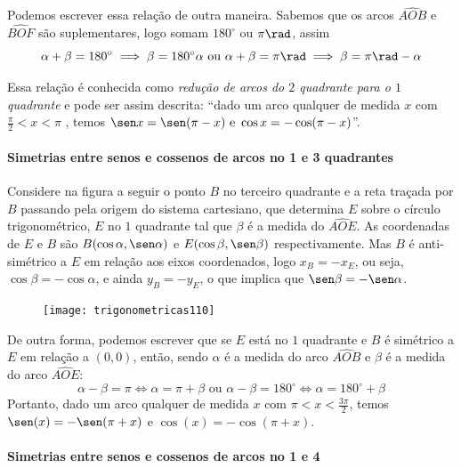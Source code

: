 Podemos escrever essa relação de outra maneira. Sabemos que os arcos $\widehat{AOB}$ e $\widehat{BOF}$ são suplementares, logo somam $180^{\circ}$ ou $\pi\rad$, assim
\begin{equation*}
\alpha+\beta=180^{\circ} \implies \beta = 180^{\circ}  \alpha\text{ ou }\alpha + \beta = \pi\rad \implies \beta = \pi\rad - \alpha
\end{equation*}

Essa relação é conhecida como \textit{redução de arcos do $2$ quadrante para o $1$ quadrante} e pode ser assim descrita: “dado um arco qualquer de medida $x$ com $\frac{\pi}{2} < x <\pi$ , temos $\sen x = \sen (\pi - x)\text{ e }\cos x = - \cos (\pi - x)$”.

\paragraph{Simetrias entre senos e cossenos de arcos no 1 e 3 quadrantes}

Considere na figura a seguir o ponto $B$ no terceiro quadrante e a reta traçada por $B$ passando pela origem do sistema cartesiano, que determina $E$ sobre o círculo trigonométrico, $E$ no $1$ quadrante tal que $\beta$ é a medida do $\widehat{AOE}$. As coordenadas de $E$ e $B$ são $B(\cos\alpha, \sen\alpha)$ e $E(\cos\beta, \sen\beta)$ respectivamente. Mas $B$ é anti-simétrico a $E$ em relação aos eixos coordenados, logo $x_B = - x_E$, ou seja, $\cos\beta = - \cos\alpha$, e ainda $y_B= - y_E$, o que implica que $\sen\beta = - \sen\alpha$.

\begin{figure}[H]
\centering

\texttt{[image: trigonometricas110]}
\end{figure}

De outra forma, podemos escrever que se $E$ está no $1$ quadrante e $B$ é simétrico a $E$ em relação a $(0,0)$, então, sendo $\alpha$ é a medida do arco $\widehat{AOB}$ e $\beta$ é a medida do arco $\widehat{AOE}$:
\begin{equation*}
\alpha-\beta=\pi\iff\alpha=\pi+\beta\text{ ou }\alpha-\beta=180^{\circ}\iff\alpha=180^{\circ}+\beta
\end{equation*}
Portanto, dado um arco qualquer de medida $x$ com $\pi<x<\frac{3\pi}{2}$, temos $\sen(x)=-\sen(\pi+x)$  e $\cos(x)=-\cos(\pi+x)$.

\paragraph{Simetrias entre senos e cossenos de arcos no 1 e 4}

